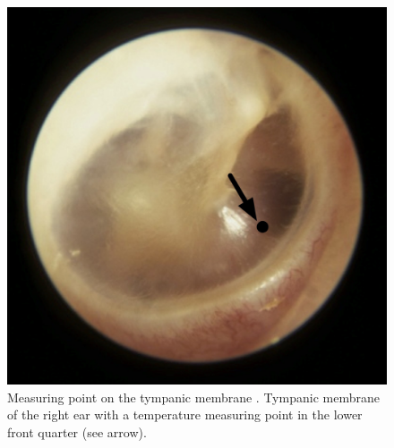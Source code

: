 \begin{figure}[t]
    \centering
    \includegraphics[scale=0.15]{thesis-doc/images/tympanic_membrane_mp.png}
    \caption{Measuring point on the tympanic membrane \cite{brinnelTympanicTemperatureCore1989}. Tympanic membrane of the right ear with a temperature measuring point in the lower front quarter (see arrow).}
    \label{fig:tympanic_membrane_mp}
\end{figure}




